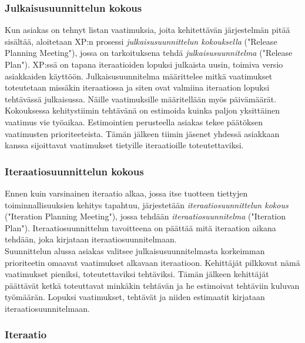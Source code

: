 \documentclass[finnish]{../tktltiki2}
\theoremstyle{definition}
\theoremstyle{remark}
\begin{document}
\subsubsection{Julkaisusuunnittelun kokous}

Kun asiakas on tehnyt listan vaatimuksia, joita kehitettävän järjestelmän pitää sisältää, aloitetaan XP:n prosessi \emph{julkaisusuunnittelun kokouksella} ("Release Planning Meeting"),
jossa on tarkoituksena tehdä \emph{julkaisusuunnitelma} ("Release Plan"). XP:ssä on tapana iteraatioiden lopuksi julkaista uusin, toimiva versio asiakkaiden käyttöön. Julkaisusuunnitelma määrittelee mitkä vaatimukset toteutetaan missäkin iteraatiossa ja siten ovat valmiina iteraation lopuksi tehtävässä julkaisussa. Näille vaatimuksille määritellään myös päivämäärät.\\

Kokouksessa kehitystiimin tehtävänä on estimoida kuinka paljon yksittäinen vaatimus vie työaikaa. Estimointien perusteella asiakas
tekee päätök\-sen vaatimusten prioriteeteista. Tämän jälkeen tiimin jäsenet
yhdessä asiakkaan kanssa sijoittavat vaatimukset tietyille iteraatioille toteutettaviksi.

\subsubsection{Iteraatiosuunnittelun kokous}

Ennen kuin varsinainen iteraatio alkaa, jossa itse tuotteen tiettyjen toiminnallisuuksien
kehitys tapahtuu, järjestetään \emph{iteraatiosuunnittelun kokous} ("Iteration Planning Meeting"), jossa tehdään \emph{iteraatiosuunnitelma} ("Iteration Plan"). Iteraatiosuunnittelun tavoitteena on päättää mitä iteraation aikana tehdään, joka kirjataan iteraatiosuunnitelmaan.\\

Suunnittelun alussa asiakas valitsee julkaisusuunnitelmasta korkeimman prioriteetin omaavat vaatimukset alkavaan iteraatioon. Kehittäjät pilkkovat nämä vaatimukset pieniksi, toteutettaviksi tehtäviksi. Tämän jälkeen kehittäjät päättävät ketkä toteuttavat minkäkin tehtävän ja he estimoivat tehtäviin kuluvan työmäärän. Lopuksi vaatimukset, tehtävät ja niiden estimaatit kirjataan iteraatiosuunnitelmaan.

\subsubsection{Iteraatio}
\end{document}
